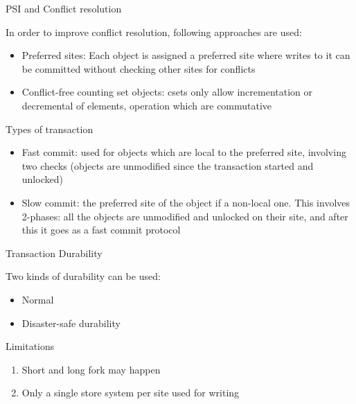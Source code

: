\documentclass{beamer}
\begin{document}
		\begin{frame}{PSI and Conflict resolution}
		
		In order to improve conflict resolution, following approaches are used:
		
		\begin{itemize}
		
		\item Preferred sites: Each object is assigned a preferred site where writes to it can be committed without checking other sites for conflicts
		\item Conflict-free counting set objects: csets only allow incrementation or decremental of elements, operation which are commutative  
		
		\end{itemize}
		
		\end{frame}

		\begin{frame}{Types of transaction}
		
		\begin{itemize}
		
		\item Fast commit: used for objects which are local to the preferred site, involving two checks (objects are unmodified since the transaction started and unlocked)
		
		\item Slow commit: the preferred site of the object if a non-local one. This involves 2-phases: all the objects are unmodified and unlocked on their site, and after this it goes as a fast commit protocol		
		
		\end{itemize}

		\end{frame}
 	
		\begin{frame}{Transaction Durability}
		
		Two kinds of durability can be used:

		\begin{itemize}
		\item Normal
		\item Disaster-safe durability
		\end{itemize}		
		
		\end{frame} 	

		\begin{frame}{Limitations}

			\begin{enumerate}
			\item Short and long fork may happen
			\item Only a single store system per site used for writing
			\end{enumerate}
			
		\end{frame}
 	
\end{document}
